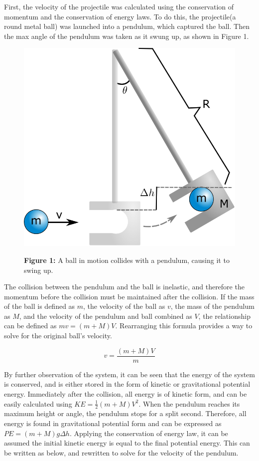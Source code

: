 \documentclass[11pt]{article}
\begin{document}
First, the velocity of the projectile was calculated using the
conservation of momentum and the conservation of energy laws. To do
this, the projectile(a round metal ball) was launched into a pendulum,
which captured the ball. Then the max angle of the pendulum was taken as
it swung up, as shown in Figure 1. 
\begin{figure}
\begin{center}
 \includegraphics[scale=0.4]{Part1Diagram.png}
 
\textbf{Figure 1:} A ball in motion collides with a pendulum, causing it to swing up.
\end{center}
\end{figure}
The collision between the pendulum and the ball is inelastic, and
therefore the momentum before the collision must be maintained after the
collision. If the mass of the ball is defined as \(m\), the velocity of
the ball as \(v\), the mass of the pendulum as \(M\), and the velocity
of the pendulum and ball combined as \(V\), the relationship can be
defined as \(mv=(m + M)V\). Rearranging this formula provides a way to
solve for the original ball's velocity.

\begin{equation}
v = \frac {(m + M)V}{m}
\end{equation}

By further observation of the system, it can be seen that the energy of
the system is conserved, and is either stored in the form of kinetic or
gravitational potential energy. Immediately after the collision, all
energy is of kinetic form, and can be easily calculated using
\(KE = \frac{1}{2}(m + M)V^2\). When the pendulum reaches its maximum
height or angle, the pendulum stops for a split second. Therefore, all
energy is found in gravitational potential form and can be expressed as
\(PE=(m + M)g\Delta h\). Applying the conservation of energy law, it can
be assumed the initial kinetic energy is equal to the final potential
energy. This can be written as below, and rewritten to solve for the
velocity of the pendulum.
\end{document}

